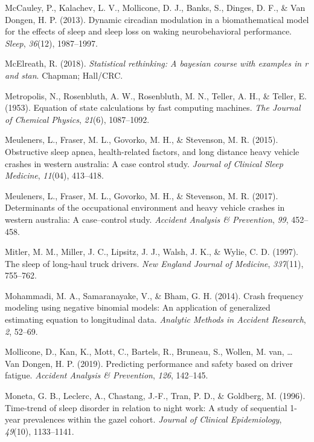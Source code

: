 \documentclass[12pt]{book}
\numberwithin{equation}{chapter}
\begin{document}
\leavevmode\hypertarget{ref-mccauley2013dynamic}{}%
McCauley, P., Kalachev, L. V., Mollicone, D. J., Banks, S., Dinges, D. F., \& Van Dongen, H. P. (2013). Dynamic circadian modulation in a biomathematical model for the effects of sleep and sleep loss on waking neurobehavioral performance. \emph{Sleep}, \emph{36}(12), 1987--1997.

\leavevmode\hypertarget{ref-mcelreath2018statistical}{}%
McElreath, R. (2018). \emph{Statistical rethinking: A bayesian course with examples in r and stan}. Chapman; Hall/CRC.

\leavevmode\hypertarget{ref-metropolis1953equation}{}%
Metropolis, N., Rosenbluth, A. W., Rosenbluth, M. N., Teller, A. H., \& Teller, E. (1953). Equation of state calculations by fast computing machines. \emph{The Journal of Chemical Physics}, \emph{21}(6), 1087--1092.

\leavevmode\hypertarget{ref-meuleners2015obstructive}{}%
Meuleners, L., Fraser, M. L., Govorko, M. H., \& Stevenson, M. R. (2015). Obstructive sleep apnea, health-related factors, and long distance heavy vehicle crashes in western australia: A case control study. \emph{Journal of Clinical Sleep Medicine}, \emph{11}(04), 413--418.

\leavevmode\hypertarget{ref-meuleners2017determinants}{}%
Meuleners, L., Fraser, M. L., Govorko, M. H., \& Stevenson, M. R. (2017). Determinants of the occupational environment and heavy vehicle crashes in western australia: A case--control study. \emph{Accident Analysis \& Prevention}, \emph{99}, 452--458.

\leavevmode\hypertarget{ref-mitler1997sleep}{}%
Mitler, M. M., Miller, J. C., Lipsitz, J. J., Walsh, J. K., \& Wylie, C. D. (1997). The sleep of long-haul truck drivers. \emph{New England Journal of Medicine}, \emph{337}(11), 755--762.

\leavevmode\hypertarget{ref-mohammadi2014crash}{}%
Mohammadi, M. A., Samaranayake, V., \& Bham, G. H. (2014). Crash frequency modeling using negative binomial models: An application of generalized estimating equation to longitudinal data. \emph{Analytic Methods in Accident Research}, \emph{2}, 52--69.

\leavevmode\hypertarget{ref-mollicone2019predicting}{}%
Mollicone, D., Kan, K., Mott, C., Bartels, R., Bruneau, S., Wollen, M. van, \ldots{} Van Dongen, H. P. (2019). Predicting performance and safety based on driver fatigue. \emph{Accident Analysis \& Prevention}, \emph{126}, 142--145.

\leavevmode\hypertarget{ref-moneta1996time}{}%
Moneta, G. B., Leclerc, A., Chastang, J.-F., Tran, P. D., \& Goldberg, M. (1996). Time-trend of sleep disorder in relation to night work: A study of sequential 1-year prevalences within the gazel cohort. \emph{Journal of Clinical Epidemiology}, \emph{49}(10), 1133--1141.
\end{document}
